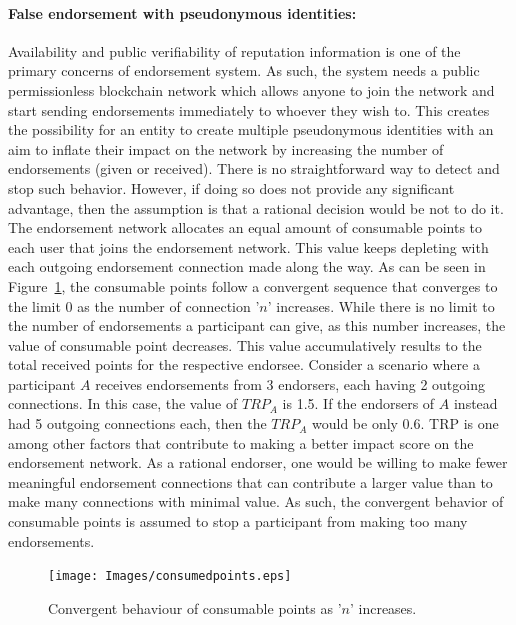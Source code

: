 \paragraph{False endorsement with pseudonymous identities:} Availability and
public verifiability of reputation information is one of the primary concerns
of endorsement system. As such, the system needs a public permissionless
blockchain network which allows anyone to join the network and start sending
endorsements immediately to whoever they wish to. This creates the possibility
for an entity to create multiple pseudonymous identities with an aim to inflate
their impact on the network by increasing the number of endorsements (given or
received). There is no straightforward way to detect and stop such behavior.
However, if doing so does not provide any significant advantage, then the
assumption is that a rational decision would be not to do it. The endorsement
network allocates an equal amount of consumable points to each user that joins
the endorsement network. This value keeps depleting with each outgoing
endorsement connection made along the way. As can be seen in
Figure~\ref{consumablePoint}, the consumable points follow a convergent
sequence that converges to the limit 0 as the number of connection '$n$'
increases. While there is no limit to the number of endorsements a participant
can give, as this number increases, the value of consumable point decreases.
This value accumulatively results to the total received points for the
respective endorsee. Consider a scenario where a participant $A$ receives
endorsements from 3 endorsers, each having 2 outgoing connections. In this
case, the value of $TRP_{A}$ is 1.5. If the endorsers of $A$ instead had 5
outgoing connections each, then the $TRP_{A}$ would be only 0.6. \ac{TRP} is
one among other factors that contribute to making a better impact score on the
endorsement network. As a rational endorser, one would be willing to make fewer
meaningful endorsement connections that can contribute a larger value than to
make many connections with minimal value. As such, the convergent behavior of
consumable points is assumed to stop a participant from making too many
endorsements. 
\begin{figure}
	\centering
	\texttt{[image: Images/consumedpoints.eps]}
	\caption{Convergent behaviour of consumable points as '$n$' increases.}
	\label{consumablePoint}
\end{figure}
